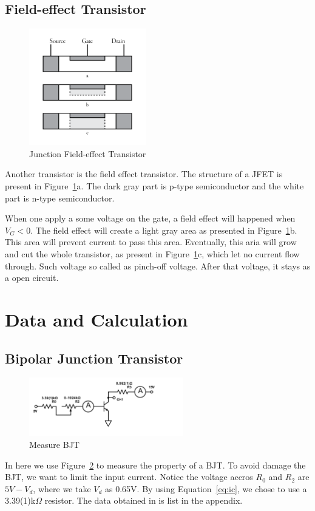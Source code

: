 \documentclass[aps,prl,reprint]{revtex4-1}
\begin{document}
\subsection{Field-effect Transistor}
\begin{figure}[h]
    \centering
    \includegraphics[height=2in]{image/JFET.pdf}
    \caption{Junction Field-effect Transistor}
    \label{fig:jfet}
\end{figure}
Another transistor is the field effect transistor. The structure of a JFET is present in Figure~\ref{fig:jfet}a. The dark gray part is p-type semiconductor and the white part is n-type semiconductor.

When one apply a some voltage on the gate, a field effect will happened when $V_G < 0$. The field effect will create a light gray area as presented in Figure~\ref{fig:jfet}b. This area will prevent current to pass this area. Eventually, this aria will grow and cut the whole transistor, as present in Figure~\ref{fig:jfet}c, which let no current flow through. Such voltage so called as pinch-off voltage. After that voltage, it stays as a open circuit.

\section{Data and Calculation}
\subsection{Bipolar Junction Transistor}
\begin{figure}[h]
    \centering
    \includegraphics[height=1in]{image/Measure-BJT.pdf}
    \caption{Measure BJT}
    \label{fig:bjtLab}
\end{figure}
In here we use Figure~\ref{fig:bjtLab} to measure the property of a BJT. To avoid damage the BJT, we want to limit the input current. Notice the voltage accros $R_0$ and $R_2$ are $5V - V_d$, where we take $V_d$ as 0.65V. By using Equation~\ref{eq:ic}, we chose to use a 3.39(1)k$\Omega$ resistor. The data obtained in is list in the appendix.
\end{document}
